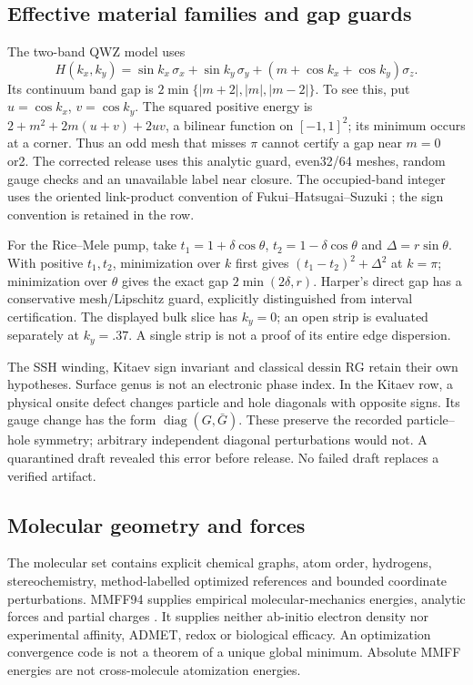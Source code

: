 \documentclass[11pt,oneside,openany]{book}
\theoremstyle{definition}\newtheorem{definition}[theorem]{Definition}
\theoremstyle{remark}\newtheorem{remark}[theorem]{Remark}
\begin{document}
\subsection{Effective material families and gap guards}
The two-band QWZ model uses
\[
 H(k_x,k_y)=\sin k_x\,\sigma_x+\sin k_y\,\sigma_y
 +(m+\cos k_x+\cos k_y)\sigma_z.
\]
Its continuum band gap is
$2\min\{|m+2|,|m|,|m-2|\}$. To see this, put
$u=\cos k_x$, $v=\cos k_y$. The squared positive energy is
$2+m^2+2m(u+v)+2uv$, a bilinear function on $[-1,1]^2$;
its minimum occurs at a corner. Thus an odd mesh that misses $\pi$ cannot
certify a gap near $m=0$ or2. The corrected release uses this analytic guard,
even32/64 meshes, random gauge checks and an unavailable label near closure.
The occupied-band integer uses the oriented link-product convention of
Fukui--Hatsugai--Suzuki \cite{DSFHS}; the sign convention is retained in the row.

For the Rice--Mele pump, take
$t_1=1+\delta\cos\theta$, $t_2=1-\delta\cos\theta$ and
$\Delta=r\sin\theta$. With positive $t_1,t_2$, minimization over $k$ first
gives $(t_1-t_2)^2+\Delta^2$ at $k=\pi$; minimization over $\theta$ gives
the exact gap $2\min(2\delta,r)$. Harper's direct gap has a conservative
mesh/Lipschitz guard, explicitly distinguished from interval certification.
The displayed bulk slice has $k_y=0$; an open strip is evaluated separately at
$k_y=.37$. A single strip is not a proof of its entire edge dispersion.

The SSH winding, Kitaev sign invariant and classical dessin RG retain their
own hypotheses. Surface genus is not an electronic phase index. In the
Kitaev row, a physical onsite defect changes particle and hole diagonals with
opposite signs. Its gauge change has the form $\operatorname{diag}(G,\bar G)$.
These preserve the recorded particle--hole symmetry; arbitrary independent
diagonal perturbations would not. A quarantined draft revealed this error
before release. No failed draft replaces a verified artifact.

\subsection{Molecular geometry and forces}
The molecular set contains explicit chemical graphs, atom order, hydrogens,
stereochemistry, method-labelled optimized references and bounded coordinate
perturbations. MMFF94 supplies empirical molecular-mechanics energies, analytic
forces and partial charges \cite{DSRDKit}. It supplies neither ab-initio
electron density nor experimental affinity, ADMET, redox or biological efficacy.
An optimization convergence code is not a theorem of a unique global minimum.
Absolute MMFF energies are not cross-molecule atomization energies.
\end{document}
